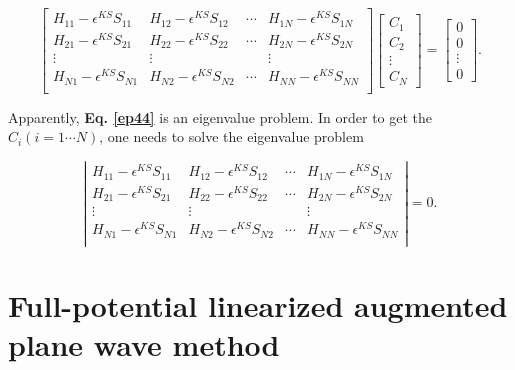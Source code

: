 \documentclass[a4paper, 12pt, titlepage,oneside,drop]{kthesis}
\begin{document}
\begin{equation}\label{ep44}
\left[
\begin{matrix}
    H_{11} - \epsilon^{KS}S_{11} & H_{12} - \epsilon^{KS}S_{12} & \cdots & H_{1N} - \epsilon^{KS}S_{1N} \\
    H_{21} - \epsilon^{KS}S_{21} & H_{22} - \epsilon^{KS}S_{22} & \cdots & H_{2N} - \epsilon^{KS}S_{2N} \\
    \vdots               & \vdots               &        & \vdots               \\
  H_{N1} - \epsilon^{KS}S_{N1} & H_{N2} - \epsilon^{KS}S_{N2} & \cdots & H_{NN} - \epsilon^{KS}S_{NN} \\
\end{matrix} \right] \left[ \begin{array}{c} C_1 \\ C_2 \\ \vdots \\ C_N\end{array} \right]
= \left[ \begin{array}{c} 0 \\ 0 \\ \vdots \\ 0 \end{array} \right].
\end{equation}

Apparently, \textbf{Eq. \ref{ep44}} is an eigenvalue problem. In order to get the $C_{i} (i = 1 \cdots N)$, one needs to solve the eigenvalue problem

\begin{equation}\label{ep4}
\left|
\begin{matrix}
    H_{11} - \epsilon^{KS}S_{11} & H_{12} - \epsilon^{KS}S_{12} & \cdots & H_{1N} - \epsilon^{KS}S_{1N} \\
   H_{21} - \epsilon^{KS}S_{21} & H_{22} - \epsilon^{KS}S_{22} & \cdots & H_{2N} - \epsilon^{KS}S_{2N} \\
    \vdots               & \vdots               &        & \vdots               \\
  H_{N1} - \epsilon^{KS}S_{N1} & H_{N2} - \epsilon^{KS}S_{N2} & \cdots & H_{NN} - \epsilon^{KS}S_{NN} \\
\end{matrix} \right|
 = 0.
\end{equation}

\section{Full-potential linearized augmented plane wave method}
\end{document}
